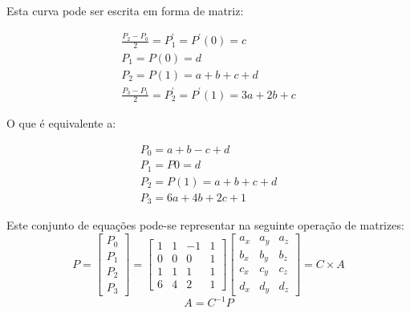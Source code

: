 Esta curva pode ser escrita em forma de matriz:

\begin{gather*}
\frac{P_{2}-P_{0}}{2} = P_{1}^{'} = P^{'}(0) = c  \\
P_{1}                 = P(0)      = d        		  \\
P_{2}                 =P(1)       =a+b+c+d    		\\
\frac{P_{3}-P_{1}}{2} = P_{2}^{'} = P^{'}(1) = 3a+2b+c 
\end{gather*}


O que é equivalente a:

\begin{gather*}
P_{0} = a+b-c+d 		\\
P_{1} = P{0} = d 		\\
P_{2}=P(1)=a+b+c+d 	\\
P_{3}=6a+4b+2c+1
\end{gather*}

Este conjunto de equações pode-se representar na seguinte operação de matrizes:
\begin{equation}	
P=\begin{bmatrix}
		       P_{0} \\
		       P_{1} \\
		       P_{2} \\
		       P_{3}
		     \end{bmatrix}
= \begin{bmatrix}
 1 & 1 & -1 & 1 \\
 0 & 0 & 0 & 1 \\
 1 & 1 & 1 & 1 \\
 6 & 4 & 2 & 1
\end{bmatrix}
\begin{bmatrix}
a_{x} & a_{y} & a_{z}    \\
b_{x} & b_{y} & b_{z}    \\
c_{x} & c_{y} & c_{z}    \\
d_{x} & d_{y} & d_{z} 
\end{bmatrix} = C \times A
\label{eq:catmullmatrix}
\end{equation}
\begin{equation}
A = C^{-1}P
\label{eq:catmullmatrixa}
\end{equation}


